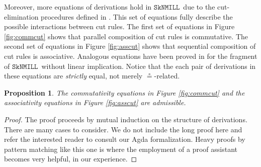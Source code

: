 \documentclass[sn-mathphys-num]{sn-jnl}%
\newcommand{\SkNMILL}{$\mathtt{SkNMILL}$}
\newcommand{\niccolo}[1]{\textcolor{red}{NV: #1}}
\theoremstyle{thmstyleone}%
\newtheorem{proposition}[theorem]{Proposition}%
\theoremstyle{thmstyletwo}%
\theoremstyle{thmstylethree}%
\begin{document}
Moreover, more equations of derivations hold in \SkNMILL~due to the cut-elimination procedures defined in \cite{UVW:protsn,wan2024}.
This set of equations fully describe the possible interactions between cut rules. The first set of equations in Figure \ref{fig:commcut} shows that parallel composition of cut rules is commutative. The second set of equations in Figure \ref{fig:asscut} shows that sequential composition of cut rules is associative.
Analogous equations have been proved in \cite{uustalu:sequent:2021} for the fragment of \SkNMILL~without linear implication.
Notice that the each pair of derivations in these equations are \emph{strictly} equal, not merely $\circeq$-related.
\begin{proposition}\label{prop:cut}
  The commutativity equations in Figure \ref{fig:commcut} and the associativity equations in Figure \ref{fig:asscut} are admissible.
\end{proposition}
\begin{proof}
  The proof proceeds by mutual induction on the structure of derivations.
  There are many cases to consider. We do not include the long proof here and refer the interested reader to consult our Agda formalization. Heavy proofs by pattern matching like this one is where the employment of a proof assistant becomes very helpful, in our experience.
\end{proof}
\end{document}
